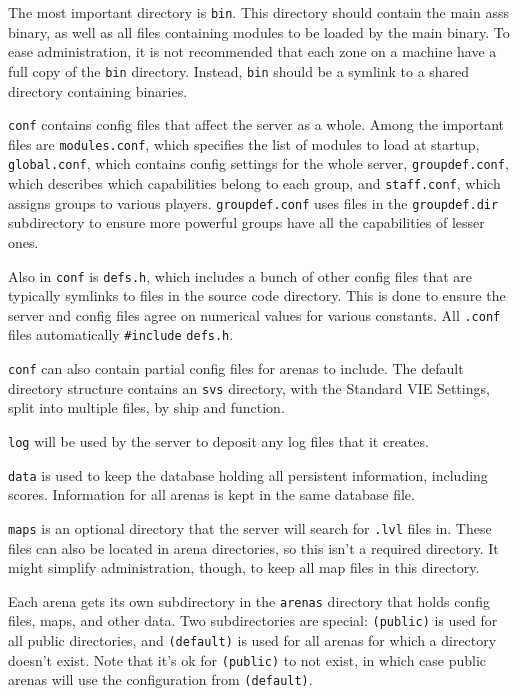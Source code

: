\documentclass{article}
\newcommand{\asss}{asss}
\begin{document}
The most important directory is \verb/bin/. This directory should
contain the main \asss{} binary, as well as all files containing modules
to be loaded by the main binary. To ease administration, it is not
recommended that each zone on a machine have a full copy of the
\verb/bin/ directory. Instead, \verb/bin/ should be a symlink to a
shared directory containing binaries.

\verb/conf/ contains config files that affect the server as a whole.
Among the important files are \verb/modules.conf/, which specifies the
list of modules to load at startup, \verb/global.conf/, which contains
config settings for the whole server, \verb/groupdef.conf/, which
describes which capabilities belong to each group, and
\verb/staff.conf/, which assigns groups to various players.
\verb/groupdef.conf/ uses files in the \verb/groupdef.dir/ subdirectory
to ensure more powerful groups have all the capabilities of lesser ones.

Also in \verb/conf/ is \verb/defs.h/, which includes a bunch of other
config files that are typically symlinks to files in the source code
directory. This is done to ensure the server and config files agree on
numerical values for various constants. All \verb/.conf/ files
automatically \verb/#include/ \verb/defs.h/.

\verb/conf/ can also contain partial config files for arenas to include.
The default directory structure contains an \verb/svs/ directory, with
the Standard VIE Settings, split into multiple files, by ship and
function.

\verb/log/ will be used by the server to deposit any log files that it
creates.

\verb/data/ is used to keep the database holding all persistent
information, including scores. Information for all arenas is kept in the
same database file.

\verb/maps/ is an optional directory that the server will search for
\verb/.lvl/ files in. These files can also be located in arena
directories, so this isn't a required directory. It might simplify
administration, though, to keep all map files in this directory.

Each arena gets its own subdirectory in the \verb/arenas/ directory that
holds config files, maps, and other data. Two subdirectories are
special: \verb/(public)/ is used for all public directories, and
\verb/(default)/ is used for all arenas for which a directory doesn't
exist. Note that it's ok for \verb/(public)/ to not exist, in which case
public arenas will use the configuration from \verb/(default)/.
\end{document}
